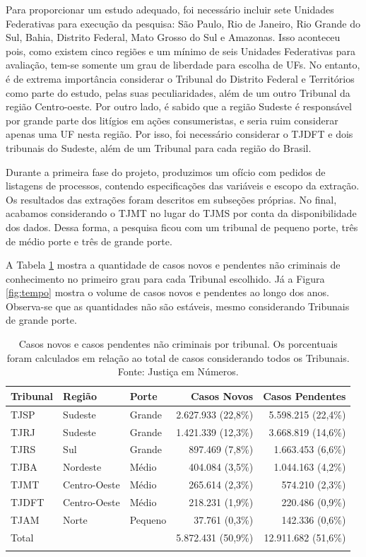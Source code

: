 \documentclass[]{report}
\begin{document}
Para proporcionar um estudo adequado, foi necessário incluir sete
Unidades Federativas para execução da pesquisa: São Paulo, Rio de
Janeiro, Rio Grande do Sul, Bahia, Distrito Federal, Mato Grosso do Sul
e Amazonas. Isso aconteceu pois, como existem cinco regiões e um mínimo
de seis Unidades Federativas para avaliação, tem-se somente um grau de
liberdade para escolha de UFs. No entanto, é de extrema importância
considerar o Tribunal do Distrito Federal e Territórios como parte do
estudo, pelas suas peculiaridades, além de um outro Tribunal da região
Centro-oeste. Por outro lado, é sabido que a região Sudeste é
responsável por grande parte dos litígios em ações consumeristas, e
seria ruim considerar apenas uma UF nesta região. Por isso, foi
necessário considerar o TJDFT e dois tribunais do Sudeste, além de um
Tribunal para cada região do Brasil.

Durante a primeira fase do projeto, produzimos um ofício com pedidos de
listagens de processos, contendo especificações das variáveis e escopo
da extração. Os resultados das extrações foram descritos em subseções
próprias. No final, acabamos considerando o TJMT no lugar do TJMS por
conta da disponibilidade dos dados. Dessa forma, a pesquisa ficou com um
tribunal de pequeno porte, três de médio porte e três de grande porte.

A Tabela \ref{tab:tabuf} mostra a quantidade de casos novos e pendentes
não criminais de conhecimento no primeiro grau para cada Tribunal
escolhido. Já a Figura \ref{fig:tempo} mostra o volume de casos novos e
pendentes ao longo dos anos. Observa-se que as quantidades não são
estáveis, mesmo considerando Tribunais de grande porte.

\begin{longtable}{lllrr}
\caption{Casos novos e casos pendentes não criminais por tribunal. Os porcentuais foram calculados em relação ao total de casos considerando todos os Tribunais. Fonte: Justiça em Números.} \\
  \hline
Tribunal & Região & Porte & Casos Novos & Casos Pendentes \\
  \hline
TJSP & Sudeste & Grande & 2.627.933 (22,8\%) & 5.598.215 (22,4\%) \\
  TJRJ & Sudeste & Grande & 1.421.339 (12,3\%) & 3.668.819 (14,6\%) \\
  TJRS & Sul & Grande & 897.469 (7,8\%) & 1.663.453 (6,6\%) \\
  TJBA & Nordeste & Médio & 404.084 (3,5\%) & 1.044.163 (4,2\%) \\
  TJMT & Centro-Oeste & Médio & 265.614 (2,3\%) & 574.210 (2,3\%) \\
  TJDFT & Centro-Oeste & Médio & 218.231 (1,9\%) & 220.486 (0,9\%) \\
  TJAM & Norte & Pequeno & 37.761 (0,3\%) & 142.336 (0,6\%) \\
  Total &  &  & 5.872.431 (50,9\%) & 12.911.682 (51,6\%) \\
   \hline
\hline
\label{tab:tabuf}
\end{longtable}
\end{document}
